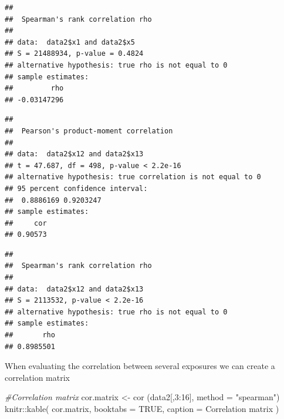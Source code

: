 \documentclass[
]{book}
\newenvironment{Shaded}{\begin{snugshade}}{\end{snugshade}}
\newcommand{\AttributeTok}[1]{\textcolor[rgb]{0.77,0.63,0.00}{#1}}
\newcommand{\CommentTok}[1]{\textcolor[rgb]{0.56,0.35,0.01}{\textit{#1}}}
\newcommand{\ConstantTok}[1]{\textcolor[rgb]{0.00,0.00,0.00}{#1}}
\newcommand{\DecValTok}[1]{\textcolor[rgb]{0.00,0.00,0.81}{#1}}
\newcommand{\FunctionTok}[1]{\textcolor[rgb]{0.00,0.00,0.00}{#1}}
\newcommand{\NormalTok}[1]{#1}
\newcommand{\OtherTok}[1]{\textcolor[rgb]{0.56,0.35,0.01}{#1}}
\newcommand{\SpecialCharTok}[1]{\textcolor[rgb]{0.00,0.00,0.00}{#1}}
\newcommand{\StringTok}[1]{\textcolor[rgb]{0.31,0.60,0.02}{#1}}
\begin{document}
\begin{verbatim}
## 
##  Spearman's rank correlation rho
## 
## data:  data2$x1 and data2$x5
## S = 21488934, p-value = 0.4824
## alternative hypothesis: true rho is not equal to 0
## sample estimates:
##         rho 
## -0.03147296
\end{verbatim}

\begin{Shaded}
\end{Shaded}

\begin{verbatim}
## 
##  Pearson's product-moment correlation
## 
## data:  data2$x12 and data2$x13
## t = 47.687, df = 498, p-value < 2.2e-16
## alternative hypothesis: true correlation is not equal to 0
## 95 percent confidence interval:
##  0.8886169 0.9203247
## sample estimates:
##     cor 
## 0.90573
\end{verbatim}

\begin{Shaded}
\end{Shaded}

\begin{verbatim}
## 
##  Spearman's rank correlation rho
## 
## data:  data2$x12 and data2$x13
## S = 2113532, p-value < 2.2e-16
## alternative hypothesis: true rho is not equal to 0
## sample estimates:
##       rho 
## 0.8985501
\end{verbatim}

When evaluating the correlation between several exposures we can create a correlation matrix

\begin{Shaded}
\begin{Highlighting}[]
\CommentTok{\#Correlation matrix}
\NormalTok{cor.matrix }\OtherTok{\textless{}{-}} \FunctionTok{cor}\NormalTok{ (data2[,}\DecValTok{3}\SpecialCharTok{:}\DecValTok{16}\NormalTok{], }\AttributeTok{method =} \StringTok{"spearman"}\NormalTok{)}
\NormalTok{knitr}\SpecialCharTok{::}\FunctionTok{kable}\NormalTok{(}
\NormalTok{  cor.matrix, }\AttributeTok{booktabs =} \ConstantTok{TRUE}\NormalTok{,}
  \AttributeTok{caption =} \StringTok{\textquotesingle{}Correlation matrix\textquotesingle{}}
\NormalTok{)}
\end{Highlighting}
\end{Shaded}
\end{document}

